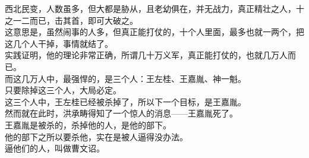 \begin{multicols}{\theparacolNo}
西北民变，人数虽多，但大都是胁从，且老幼俱在，并无战力，真正精壮之人，十之一二而已，击其首，即可大破之。\\

这意思是，虽然闹事的人多，但真正能打仗的，十个人里面，最多也就一两个，把这几个人干掉，事情就结了。\\

实践证明，他的理论非常正确，所谓几十万义军，真正能打仗的，也就几万人而已。\\

而这几万人中，最强悍的，是三个人：王左桂、王嘉胤、神一魁。\\

只要除掉这三个人，大局必定。\\

这三个人中，王左桂已经被杀掉了，所以下一个目标，是王嘉胤。\\

然而就在此时，洪承畴得知了一个惊人的消息——王嘉胤死了。\\

王嘉胤是被杀的，杀掉他的人，是他的部下。\\

他的部下之所以要杀他，实在是被人逼得没办法。\\

逼他们的人，叫做曹文诏。\\
\ifnum{}
	\end{multicols}
\fi
\newpage

